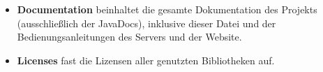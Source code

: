 \begin{itemize}
    \item \textbf{Documentation}
    beinhaltet die gesamte Dokumentation des Projekts
    (ausschließlich der JavaDocs),
    inklusive dieser Datei und der Bedienungsanleitungen des Servers und der Website.

    \item \textbf{Licenses}
    fast die Lizensen aller genutzten Bibliotheken auf.
\end{itemize}
